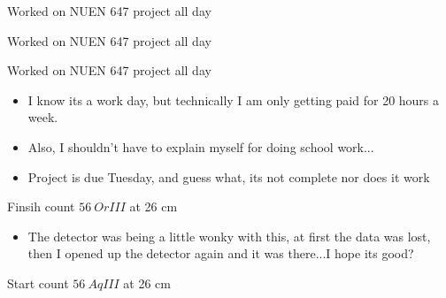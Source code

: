 \documentclass[idxtotoc,hyperref,openany,oneside]{labbook} %
\newcommand{\cmark}{\ding{51}}%
\newcommand{\done}{\rlap{$\square$}{\raisebox{2pt}{\large\hspace{1pt}\cmark}}%
  \hspace{-2.5pt}}
\begin{document}



\begin{todolist}
\item[\done]{Worked on NUEN 647 project all day}
\end{todolist}





\begin{todolist}
\item[\done]{Worked on NUEN 647 project all day}
\end{todolist}





\begin{todolist}
\item[\done]{Worked on NUEN 647 project all day}
  \begin{itemize}
  \item{I know its a work day, but technically I am only
    getting paid for 20 hours a week.}
  \item{Also, I shouldn't have to explain myself for doing
    school work...}
  \item{Project is due Tuesday, and guess what, its not
    complete nor does it work}
  \end{itemize}
\end{todolist}






\begin{todolist}
\item[\done]{Finsih count $\boxed{56\ OrIII}$ at 26 cm}
  \begin{itemize}
  \item{The detector was being a little wonky with this,
    at first the data was lost, then I opened up the
    detector again and it was there...I hope its good?}
  \end{itemize}
\item[\done]{Start count $\boxed{56\ AqIII}$ at 26 cm}
\end{todolist}
\end{document}

